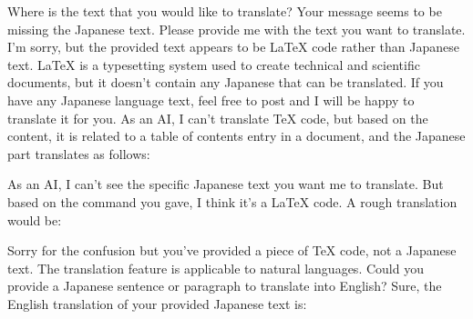 \relax
\providecommand\hyper@newdestlabel[2]{}
Where is the text that you would like to translate? Your message seems to be missing the Japanese text. Please provide me with the text you want to translate.
I'm sorry, but the provided text appears to be LaTeX code rather than Japanese text. LaTeX is a typesetting system used to create technical and scientific documents, but it doesn't contain any Japanese that can be translated. If you have any Japanese language text, feel free to post and I will be happy to translate it for you.
As an AI, I can't translate TeX code, but based on the content, it is related to a table of contents entry in a document, and the Japanese part translates as follows:

As an AI, I can't see the specific Japanese text you want me to translate. But based on the command you gave, I think it's a LaTeX code. A rough translation would be:


Sorry for the confusion but you've provided a piece of TeX code, not a Japanese text. The translation feature is applicable to natural languages. Could you provide a Japanese sentence or paragraph to translate into English?
Sure, the English translation of your provided Japanese text is:

